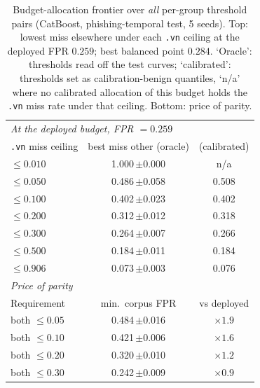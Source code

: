 \begin{table}[t]
\centering
\caption{Budget-allocation frontier over \emph{all} per-group threshold pairs
(CatBoost, phishing-temporal test, 5 seeds). Top: lowest miss elsewhere under each
\texttt{.vn} ceiling at the deployed FPR $0.259$; best balanced point $0.284$.
`Oracle': thresholds read off the test curves; `calibrated': thresholds set as
calibration-benign quantiles, `n/a' where no calibrated allocation of this budget holds the
\texttt{.vn} miss rate under that ceiling. Bottom: price of parity.}
\label{tab:budgetfrontier}
\small\setlength{\tabcolsep}{4pt}
\begin{tabular}{l c c}
\toprule
\multicolumn{3}{l}{\emph{At the deployed budget, FPR $=0.259$}} \\
\texttt{.vn} miss ceiling & best miss other (oracle) & (calibrated) \\
\midrule
$\leq 0.010$ & 1.000{\scriptsize\,$\pm$0.000} & n/a \\
$\leq 0.050$ & 0.486{\scriptsize\,$\pm$0.058} & 0.508 \\
$\leq 0.100$ & 0.402{\scriptsize\,$\pm$0.023} & 0.402 \\
$\leq 0.200$ & 0.312{\scriptsize\,$\pm$0.012} & 0.318 \\
$\leq 0.300$ & 0.264{\scriptsize\,$\pm$0.007} & 0.266 \\
$\leq 0.500$ & 0.184{\scriptsize\,$\pm$0.011} & 0.184 \\
$\leq 0.906$ & 0.073{\scriptsize\,$\pm$0.003} & 0.076 \\
\midrule
\multicolumn{3}{l}{\emph{Price of parity}} \\
Requirement & min.\ corpus FPR & vs deployed \\
\midrule
both $\leq 0.05$ & 0.484{\scriptsize\,$\pm$0.016} & $\times1.9$ \\
both $\leq 0.10$ & 0.421{\scriptsize\,$\pm$0.006} & $\times1.6$ \\
both $\leq 0.20$ & 0.320{\scriptsize\,$\pm$0.010} & $\times1.2$ \\
both $\leq 0.30$ & 0.242{\scriptsize\,$\pm$0.009} & $\times0.9$ \\
\bottomrule
\end{tabular}
\end{table}
